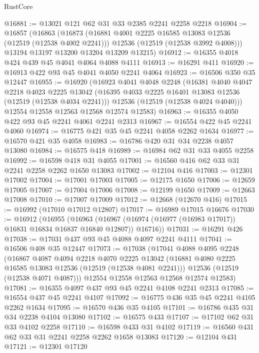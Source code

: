 \begin{lexlean}{RustCore}
\begin{coremodule}
@16881 := @13021 @121 @62 @31 @33 @2385 @2241 @2258 @2218
@16904 := @16857
    (@16863
      (@16873
        (@16881 @4001 @2225 @16585 @13083 @12536 (@12519 (@12538 @4002 @2241)))
        @12536
        (@12519 (@12538 @3992 @4008)))
      @13194
      @13197
      @13200
      @13204
      @13209
      @13215)
@16912 := @16355 @4018 @424 @439 @45 @4041 @4064 @4088 @4111
@16913 := @16291 @411
@16920 := @16913 @422 @93 @45 @4041 @4050 @2241 @4064
@16923 := @16506 @350 @35 @12447
@16955 := @16920
    (@16923
      @4041
      @4048
      @2248
      (@16381
        @4040
        @4047
        @2218
        @4023
        @2225
        @13042
        (@16395 @4033 @2225 @16401 @13083 @12536 (@12519 (@12538 @4034 @2241)))
        @12536
        (@12519 (@12538 @4024 @4040)))
      @12554
      @12558
      @12563
      @12568
      @12574
      @12583)
@16963 := @16355 @4050 @422 @93 @45 @2241 @4061 @2241 @2313
@16967 := @16554 @422 @45 @2241 @4060
@16974 := @16775 @421 @35 @45 @2241 @4058 @2262 @1634
@16977 := @16570 @421 @35 @4058
@16983 := @16786 @420 @31 @34 @2238 @4057 @13080
@16984 := @16575 @418
@16989 := @16984 @62 @31 @33 @4055 @2258
@16992 := @16598 @418 @31 @4055
@17001 := @16560 @416 @62 @33 @31 @2241 @2258 @2262 @1650 @13083
@17002 := @12104 @416
@17003 := @12301 @17002
@17004 := @17001 @17003
@17005 := @12175 @1650
@17006 := @12659 @17005
@17007 := @17004 @17006
@17008 := @12199 @1650
@17009 := @12663 @17008
@17010 := @17007 @17009
@17012 := @12668 (@12670 @416)
@17015 := @16992 (@17010 @17012 @12807)
@17017 := @16989 @17015 @16676
@17030 := @16912
    (@16955
      (@16963 (@16967 (@16974 (@16977 (@16983 @17017)) @16831 @16834 @16837 @16840 @12807)) @16716))
@17031 := @16291 @426
@17038 := @17031 @437 @93 @45 @4088 @4097 @2241 @4111
@17041 := @16506 @408 @35 @12447
@17073 := @17038
    (@17041
      @4088
      @4095
      @2248
      (@16867
        @4087
        @4094
        @2218
        @4070
        @2225
        @13042
        (@16881 @4080 @2225 @16585 @13083 @12536 (@12519 (@12538 @4081 @2241)))
        @12536
        (@12519 (@12538 @4071 @4087)))
      @12554
      @12558
      @12563
      @12568
      @12574
      @12583)
@17081 := @16355 @4097 @437 @93 @45 @2241 @4108 @2241 @2313
@17085 := @16554 @437 @45 @2241 @4107
@17092 := @16775 @436 @35 @45 @2241 @4105 @2262 @1634
@17095 := @16570 @436 @35 @4105
@17101 := @16786 @435 @31 @34 @2238 @4104 @13080
@17102 := @16575 @433
@17107 := @17102 @62 @31 @33 @4102 @2258
@17110 := @16598 @433 @31 @4102
@17119 := @16560 @431 @62 @33 @31 @2241 @2258 @2262 @1658 @13083
@17120 := @12104 @431
@17121 := @12301 @17120

\end{coremodule}
\end{lexlean}
